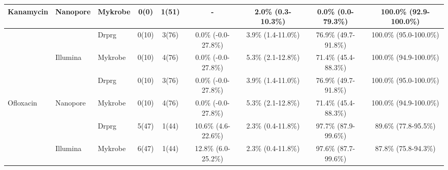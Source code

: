 \begin{table}
{\begin{tabular}{|l|l|l|c|c|c|c|c|c|}
\multirow{-4}{*}{Kanamycin}    & \multirow{-2}{*}{Nanopore} & Mykrobe                       & 0(0)                          & 1(51)                          & -                                            & 2.0\% (0.3-10.3\%)                           & 0.0\% (0.0-79.3\%)                           & 100.0\% (92.9-100.0\%)                         \\ \hline
                               &                            & \cellcolor[HTML]{EFEFEF}Drprg & \cellcolor[HTML]{EFEFEF}0(10) & \cellcolor[HTML]{EFEFEF}3(76)  & \cellcolor[HTML]{EFEFEF}0.0\% (-0.0-27.8\%)  & \cellcolor[HTML]{EFEFEF}3.9\% (1.4-11.0\%)   & \cellcolor[HTML]{EFEFEF}76.9\% (49.7-91.8\%) & \cellcolor[HTML]{EFEFEF}100.0\% (95.0-100.0\%) \\ \cline{3-9} 
                               & \multirow{-2}{*}{Illumina} & Mykrobe                       & 0(10)                         & 4(76)                          & 0.0\% (-0.0-27.8\%)                          & 5.3\% (2.1-12.8\%)                           & 71.4\% (45.4-88.3\%)                         & 100.0\% (94.9-100.0\%)                         \\ \cline{2-9} 
                               &                            & \cellcolor[HTML]{EFEFEF}Drprg & \cellcolor[HTML]{EFEFEF}0(10) & \cellcolor[HTML]{EFEFEF}3(76)  & \cellcolor[HTML]{EFEFEF}0.0\% (-0.0-27.8\%)  & \cellcolor[HTML]{EFEFEF}3.9\% (1.4-11.0\%)   & \cellcolor[HTML]{EFEFEF}76.9\% (49.7-91.8\%) & \cellcolor[HTML]{EFEFEF}100.0\% (95.0-100.0\%) \\ \cline{3-9} 
\multirow{-4}{*}{Ofloxacin}    & \multirow{-2}{*}{Nanopore} & Mykrobe                       & 0(10)                         & 4(76)                          & 0.0\% (-0.0-27.8\%)                          & 5.3\% (2.1-12.8\%)                           & 71.4\% (45.4-88.3\%)                         & 100.0\% (94.9-100.0\%)                         \\ \hline
                               &                            & \cellcolor[HTML]{EFEFEF}Drprg & \cellcolor[HTML]{EFEFEF}5(47) & \cellcolor[HTML]{EFEFEF}1(44)  & \cellcolor[HTML]{EFEFEF}10.6\% (4.6-22.6\%)  & \cellcolor[HTML]{EFEFEF}2.3\% (0.4-11.8\%)   & \cellcolor[HTML]{EFEFEF}97.7\% (87.9-99.6\%) & \cellcolor[HTML]{EFEFEF}89.6\% (77.8-95.5\%)   \\ \cline{3-9} 
                               & \multirow{-2}{*}{Illumina} & Mykrobe                       & 6(47)                         & 1(44)                          & 12.8\% (6.0-25.2\%)                          & 2.3\% (0.4-11.8\%)                           & 97.6\% (87.7-99.6\%)                         & 87.8\% (75.8-94.3\%)                           \\ \cline{2-9} 

\end{tabular}}
\end{table}
